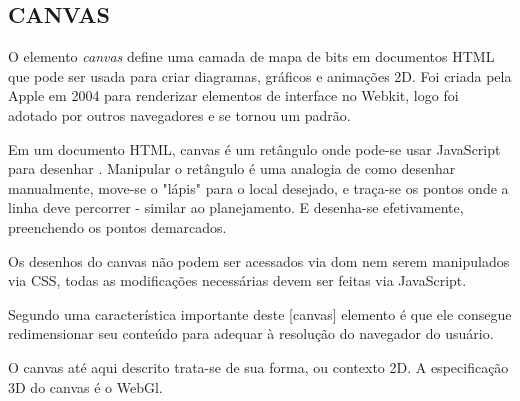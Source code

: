 \subsection{CANVAS}
\begin{draft}
O elemento \textit{canvas} define uma camada de mapa de bits em documentos
HTML que pode ser usada para criar diagramas, gráficos e animações
2D. Foi criada pela Apple em 2004 para renderizar elementos de interface
no Webkit, logo foi adotado por outros navegadores e se tornou um
padrão.

Em um documento HTML, canvas é um retângulo onde pode-se usar
JavaScript para desenhar \autocite[pp. 113]{diveIntohtml}. Manipular o
retângulo é uma analogia de como desenhar manualmente, move-se
o "lápis" para o local desejado, e traça-se os pontos onde a linha
deve percorrer - similar ao planejamento. E desenha-se efetivamente,
preenchendo os pontos demarcados.

Os desenhos do canvas não podem ser acessados via dom nem serem manipulados via CSS, todas as modificações necessárias devem ser feitas via JavaScript.

Segundo \cite{gwt} uma característica importante deste [canvas]
elemento é que ele consegue redimensionar seu conteúdo para adequar à
resolução do navegador do usuário.

O canvas até aqui descrito trata-se de sua forma, ou contexto 2D. A
especificação 3D do canvas é o WebGl.

\end{draft}
